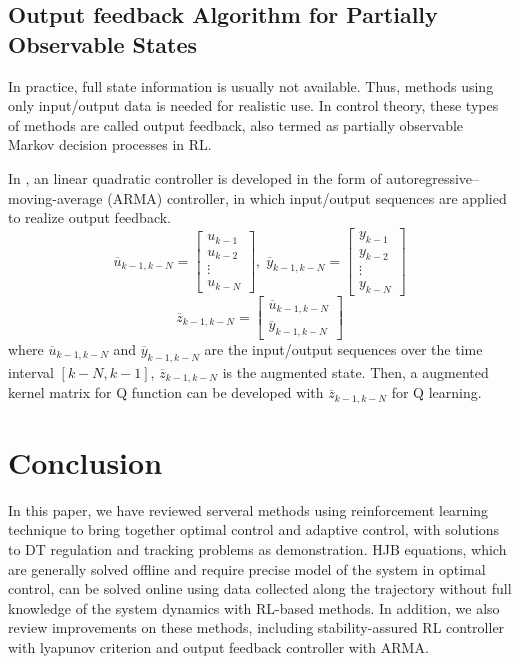 \documentclass[conference]{IEEEtran}
\begin{document}
\subsection{Output feedback Algorithm for Partially Observable States}
In practice, full state information is usually not available. Thus, methods using only input/output data is needed for realistic use. In control theory, these types of methods are called output feedback, also termed as partially observable Markov decision processes in RL.
\par In \cite{b4}, an linear quadratic controller is developed in the form of autoregressive–moving-average (ARMA) controller, in which input/output sequences are applied to realize output feedback.
\[
\overline{u}_{k-1, k-N} = 
\begin{bmatrix} 
u_{k-1}\\
u_{k-2} \\
\vdots \\
u_{k-N}
\end{bmatrix},\;
\overline{y}_{k-1, k-N} = 
\begin{bmatrix} 
y_{k-1}\\
y_{k-2} \\
\vdots \\
y_{k-N}
\end{bmatrix}
\]
\[\overline{z}_{k-1, k-N} = 
\begin{bmatrix} 
\overline{u}_{k-1, k-N}\\
\overline{y}_{k-1, k-N}
\end{bmatrix}
\]
where \(\overline{u}_{k-1, k-N}\) and \(\overline{y}_{k-1, k-N}\) are the input/output sequences over the time interval \([k-N, k-1]\), \(\overline{z}_{k-1, k-N}\) is the augmented state. Then, a augmented kernel matrix for Q function can be developed with \(\overline{z}_{k-1, k-N}\) for Q learning.
\section{Conclusion} \label{conclusion}
In this paper, we have reviewed serveral methods using reinforcement learning technique to bring together optimal control and adaptive control, with solutions to DT regulation and tracking problems as demonstration. HJB equations, which are generally solved offline and require precise model of the system in optimal control, can be solved online using data collected along the trajectory without full knowledge of the system dynamics with RL-based methods. In addition, we also review improvements on these methods, including stability-assured RL controller with lyapunov criterion and output feedback controller with ARMA.
\end{document}

